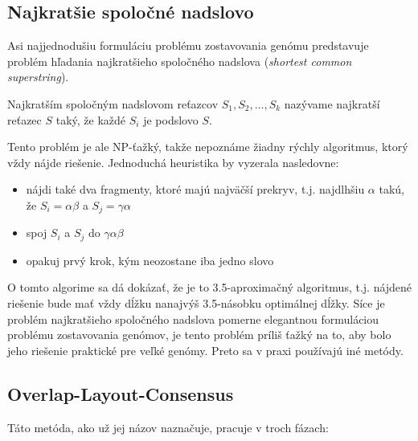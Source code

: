     \subsection{Najkratšie spoločné nadslovo}
    Asi najjednodušiu formuláciu problému zostavovania genómu predstavuje
    problém hľadania najkratšieho spoločného nadslova (\emph{shortest common
    superstring}).
    
    \begin{defn}
        Najkratším spoločným nadslovom reťazcov $S_1, S_2, \ldots, S_k$ nazývame
        najkratší reťazec $S$ taký, že každé $S_i$ je podslovo $S$.
    \end{defn}
    
    Tento problém je ale NP-ťažký, takže nepoznáme žiadny rýchly algoritmus,
    ktorý vždy nájde riešenie. Jednoduchá heuristika by vyzerala nasledovne:
    
    \begin{itemize}
        \item nájdi také dva fragmenty, ktoré majú najväčší prekryv, t.j.
        najdlhšiu $\alpha$ takú, že $S_i = \alpha\beta$ a $S_j = \gamma\alpha$
        \item spoj $S_i$ a $S_j$ do $\gamma\alpha\beta$
        \item opakuj prvý krok, kým neozostane iba jedno slovo
    \end{itemize}
    
    O tomto algorime sa dá dokázať, že je to 3.5-aproximačný algoritmus, t.j.
    nájdené riešenie bude mať vždy dĺžku nanajvýš 3.5-násobku optimálnej dĺžky.
    Síce je problém najkratšieho spoločného nadslova pomerne elegantnou
    formuláciou problému zostavovania genómov, je tento problém príliš ťažký na
    to, aby bolo jeho riešenie praktické pre veľké genómy. Preto sa v praxi
    používajú iné metódy.

    \subsection{Overlap-Layout-Consensus}
    Táto metóda, ako už jej názov naznačuje, pracuje v troch fázach:
    
